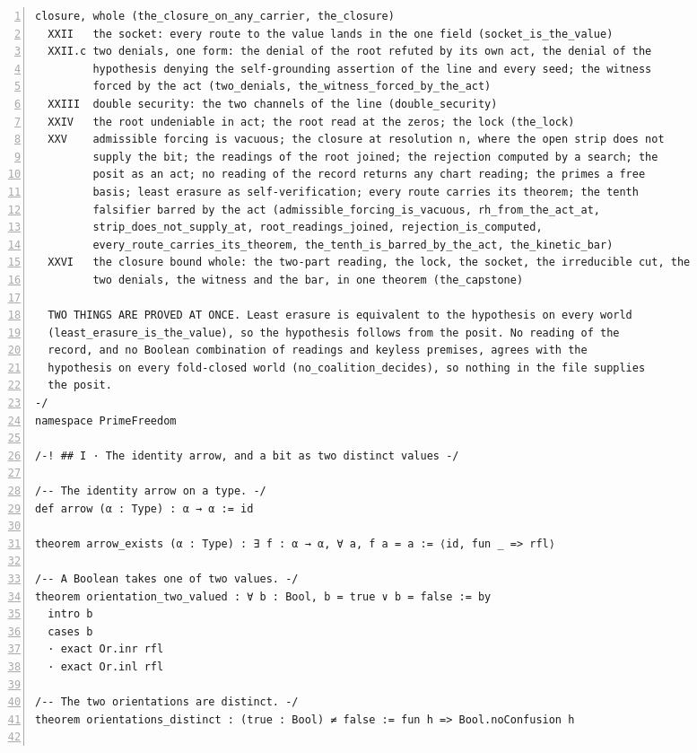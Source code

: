 \documentclass[10pt]{article}
\newcommand{\leansize}{\fontsize{5.5pt}{6.75pt}\selectfont}
\begin{document}
\begin{multicols}{2}
\begin{Verbatim}[numbers=left,firstnumber=1,numbersep=3pt,xleftmargin=2.6em,breaklines=true,breakanywhere=true,breakautoindent=false,breakindent=1.4em,breaksymbolleft={},breakanywheresymbolpre={},fontsize=\leansize]
         closure, whole (the_closure_on_any_carrier, the_closure)
  XXII   the socket: every route to the value lands in the one field (socket_is_the_value)
  XXII.c two denials, one form: the denial of the root refuted by its own act, the denial of the
         hypothesis denying the self-grounding assertion of the line and every seed; the witness
         forced by the act (two_denials, the_witness_forced_by_the_act)
  XXIII  double security: the two channels of the line (double_security)
  XXIV   the root undeniable in act; the root read at the zeros; the lock (the_lock)
  XXV    admissible forcing is vacuous; the closure at resolution n, where the open strip does not
         supply the bit; the readings of the root joined; the rejection computed by a search; the
         posit as an act; no reading of the record returns any chart reading; the primes a free
         basis; least erasure as self-verification; every route carries its theorem; the tenth
         falsifier barred by the act (admissible_forcing_is_vacuous, rh_from_the_act_at,
         strip_does_not_supply_at, root_readings_joined, rejection_is_computed,
         every_route_carries_its_theorem, the_tenth_is_barred_by_the_act, the_kinetic_bar)
  XXVI   the closure bound whole: the two-part reading, the lock, the socket, the irreducible cut, the
         two denials, the witness and the bar, in one theorem (the_capstone)

  TWO THINGS ARE PROVED AT ONCE. Least erasure is equivalent to the hypothesis on every world
  (least_erasure_is_the_value), so the hypothesis follows from the posit. No reading of the
  record, and no Boolean combination of readings and keyless premises, agrees with the
  hypothesis on every fold-closed world (no_coalition_decides), so nothing in the file supplies
  the posit.
-/
namespace PrimeFreedom

/-! ## I · The identity arrow, and a bit as two distinct values -/

/-- The identity arrow on a type. -/
def arrow (α : Type) : α → α := id

theorem arrow_exists (α : Type) : ∃ f : α → α, ∀ a, f a = a := ⟨id, fun _ => rfl⟩

/-- A Boolean takes one of two values. -/
theorem orientation_two_valued : ∀ b : Bool, b = true ∨ b = false := by
  intro b
  cases b
  · exact Or.inr rfl
  · exact Or.inl rfl

/-- The two orientations are distinct. -/
theorem orientations_distinct : (true : Bool) ≠ false := fun h => Bool.noConfusion h


\end{Verbatim}
\end{multicols}
\end{document}

